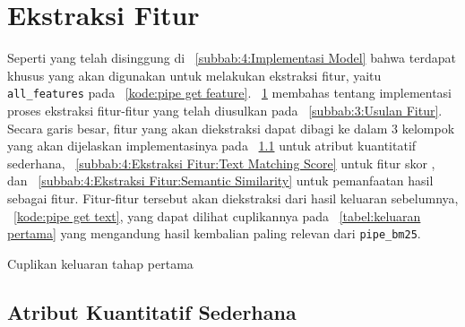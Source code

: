 \section{Ekstraksi Fitur}
\label{subbab:4:Ekstraksi Fitur}
Seperti yang telah disinggung di \subbab{}~\ref{subbab:4:Implementasi Model} bahwa terdapat \pipeline{} khusus yang akan digunakan untuk melakukan ekstraksi fitur, yaitu \pipeline{} \lstinline{all_features} pada \kode{}~\ref{kode:pipe get feature}. \subbab{}~\ref{subbab:4:Ekstraksi Fitur} membahas tentang implementasi proses ekstraksi fitur-fitur yang telah diusulkan pada \subbab{}~\ref{subbab:3:Usulan Fitur}. Secara garis besar, fitur yang akan diekstraksi dapat dibagi ke dalam 3 kelompok yang akan dijelaskan implementasinya pada \subbab{}~\ref{subbab:4:Ekstraksi Fitur:Atribut Kuantitatif Sederhana} untuk atribut kuantitatif sederhana, \subbab{}~\ref{subbab:4:Ekstraksi Fitur:Text Matching Score} untuk fitur skor \txt{} \matching{}, dan \subbab{}~\ref{subbab:4:Ekstraksi Fitur:Semantic Similarity} untuk pemanfaatan hasil \encoder{} sebagai fitur. Fitur-fitur tersebut akan diekstraksi dari hasil keluaran \pipeline{} sebelumnya, \kode{}~\ref{kode:pipe get text}, yang dapat dilihat cuplikannya pada \tabel{}~\ref{tabel:keluaran pertama} yang mengandung hasil kembalian paling relevan dari \lstinline{pipe_bm25}.
\begin{table}[H]
    \centering
    \caption{Cuplikan keluaran \pipeline{} tahap \ranking{} pertama}
    \label{tabel:keluaran pertama}
\end{table}

\subsection{Atribut Kuantitatif Sederhana}
\label{subbab:4:Ekstraksi Fitur:Atribut Kuantitatif Sederhana}

